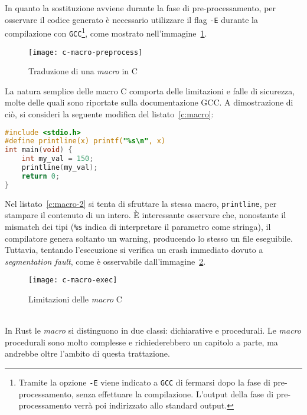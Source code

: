 In quanto la sostituzione avviene durante la fase di pre-processamento,
per osservare il codice generato è necessario utilizzare il flag \texttt{-E} durante la compilazione con
 \texttt{GCC}\footnote{Tramite la opzione \texttt{-E} viene indicato a \texttt{GCC} di fermarsi dopo la fase di pre-processamento, 
 senza effettuare la compilazione. L'output della fase di pre-processamento verrà poi indirizzato allo standard output.}, 
 come mostrato nell'immagine~\ref{c:macro-preprocess}. \hfill
\begin{figure}[htbp]
    \begin{center}
        \texttt{[image: c-macro-preprocess]}
        \caption{Traduzione di una \textit{macro} in C}\label{c:macro-preprocess}
    \end{center}
\end{figure}
La natura semplice delle macro C comporta delle limitazioni e falle di sicurezza, molte delle quali sono riportate sulla documentazione GCC\cite{GNU-online-docs}. 
A dimostrazione di ciò, si consideri la seguente modifica del listato~\ref{c:macro}:
\begin{lstlisting}[language=C, caption={Utilizzo scorretto di \textit{macro} in C}, label={c:macro-2}]
#include <stdio.h>
#define printline(x) printf("%s\n", x)
int main(void) {
    int my_val = 150;
    printline(my_val);
    return 0;
}
\end{lstlisting}
Nel listato~\ref{c:macro-2} si tenta di sfruttare la stessa macro, \texttt{printline}, per stampare il contenuto di un intero. 
È interessante osservare che, nonostante il mismatch dei tipi (\texttt{\%s} indica di interpretare il parametro come stringa), il compilatore
 genera soltanto un warning, producendo lo stesso un file eseguibile. 
Tuttavia, tentando l'esecuzione si verifica un crash immediato dovuto a \textit{segmentation fault},
come è osservabile dall'immagine~\ref{c:macro-exec}. \hfill
\begin{figure}[htbp]
    \begin{center}
        \texttt{[image: c-macro-exec]}
        \caption{Limitazioni delle \textit{macro} C}\label{c:macro-exec}
    \end{center}
\end{figure}
\vspace{10pt}\\
\noindent In Rust le \textit{macro} si distinguono in due classi: dichiarative e procedurali. Le \textit{macro} procedurali sono molto complesse e richiederebbero un capitolo
a parte, ma andrebbe oltre l'ambito di questa trattazione. 

